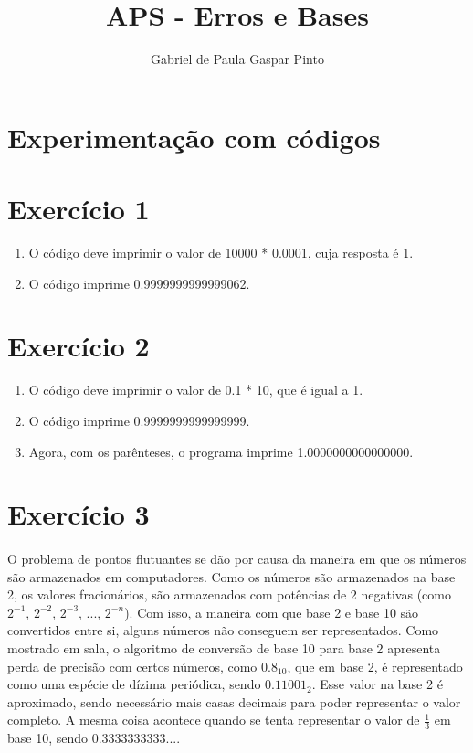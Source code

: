 \documentclass{article}
\title{APS - Erros e Bases}
\author{Gabriel de Paula Gaspar Pinto}
\date{}
\begin{document}
\maketitle

\section{Experimentação com códigos}

\section*{Exercício 1}

\begin{enumerate}[label=(\alph*)]
    \item O código deve imprimir o valor de 10000 * 0.0001, cuja resposta é 1.
    \item O código imprime 0.9999999999999062.
\end{enumerate}

\section*{Exercício 2}

\begin{enumerate}[label=(\alph*)]
    \item O código deve imprimir o valor de 0.1 * 10, que é igual a 1.
    \item O código imprime 0.9999999999999999.
    \item Agora, com os parênteses, o programa imprime 1.0000000000000000.
\end{enumerate}

\section*{Exercício 3}
\paragraph{}O problema de pontos flutuantes se dão por causa da maneira em que os números são armazenados em computadores. Como os números são armazenados na base 2, os valores fracionários, são armazenados com potências de 2 negativas (como $2^{-1}$, $2^{-2}$, $2^{-3}$, ..., $2^{-n}$). Com isso, a maneira com que base 2 e base 10 são convertidos entre si, alguns números não conseguem ser representados. Como mostrado em sala, o algoritmo de conversão de base 10 para base 2 apresenta perda de precisão com certos números, como $0.8_{\text{10}}$, que em base 2, é representado como uma espécie de dízima periódica, sendo $0.11001_{\text{2}}$. Esse valor na base 2 é aproximado, sendo necessário mais casas decimais para poder representar o valor completo. A mesma coisa acontece quando se tenta representar o valor de $\frac{1}{3}$ em base 10, sendo 0.3333333333....
\end{document}

